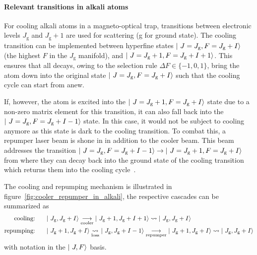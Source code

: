 \paragraph{Relevant transitions in alkali atoms}
\sloppy For cooling alkali atoms in a magneto-optical trap, transitions between electronic levels $J_\text{g}$ and $J_\text{g} + 1$ are used for scattering (g for ground state). The cooling transition can be imple\-mented between hyperfine states $\Ket{~J = J_\text{g}, F = J_\text{g} + I}$ (the highest $F$ in the $J_\text{g}$ manifold), and $\Ket{~J = J_\text{g} + 1, F= J_\text{g} + I + 1}$. This ensures that all decays, owing to the selection rule $\Delta F \in \{-1, 0, 1\}$,  bring the atom down into the original state $\Ket{~J = J_\text{g}, F = J_\text{g} + I}$ such that the cooling cycle can start from anew.

If, however, the atom is excited into the $\Ket{~J = J_\text{g} + 1, F = J_\text{g} + I}$ state due to a non-zero matrix element for this transition, it can also fall back into the $\Ket{~J = J_\text{g}, F = J_\text{g} + I - 1}$ state. In this case, it would not be subject to cooling anymore as this state is dark to the cooling transition. To combat this, a repumper laser beam is shone in in addition to the cooler beam. This beam addresses the transition $\Ket{~J = J_\text{g}, F = J_\text{g} + I - 1} \rightarrow \Ket{~J = J_\text{g} + 1, F = J_\text{g} + I}$ from where they can decay back into the ground state of the cooling transition which returns them into the cooling cycle~\cite{metcalf_laser_1999}.

The cooling and repumping mechanism is illustrated in figure~\ref{fig:cooler_repumper_in_alkali}, the respective cascades can be summarized as
\begin{align}
    \label{eq:cooler_cascade}\text{cooling:}~~~~~ & \Ket{~J_\text{g},J_\text{g} + I} \underset{\text{cooler}}{\longrightarrow} \Ket{~J_\text{g} + 1, J_\text{g} + I + 1} \rightsquigarrow  \Ket{~J_\text{g}, J_\text{g} + I}\\
    \label{eq:repumper_cascade}\text{repumping:}~~~~~ & \Ket{~J_\text{g} + 1, J_\text{g} + I} \underset{\text{loss}}{\rightsquigarrow} \Ket{~J_\text{g}, J_\text{g} + I - 1}  \underset{\text{repumper}}{\longrightarrow} \Ket{~J_\text{g} + 1, J_\text{g} + I} \rightsquigarrow  \Ket{~J_\text{g}, J_\text{g} + I}
\end{align}
with notation in the $\Ket{~J, F}$ basis.

